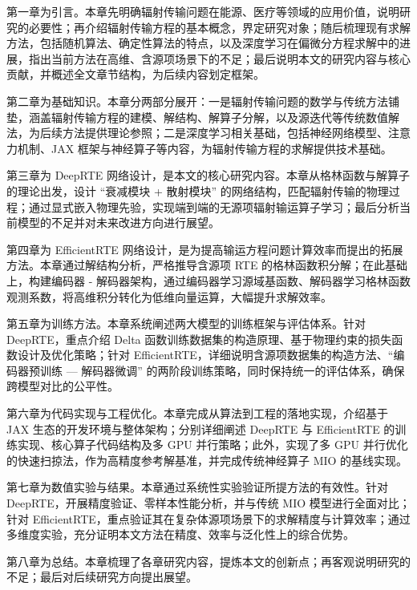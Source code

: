 第一章为引言。本章先明确辐射传输问题在能源、医疗等领域的应用价值，说明研究的必要性；再介绍辐射传输方程的基本概念，界定研究对象；随后梳理现有求解方法，包括随机算法、确定性算法的特点，以及深度学习在偏微分方程求解中的进展，指出当前方法在高维、含源项场景下的不足；最后说明本文的研究内容与核心贡献，并概述全文章节结构，为后续内容划定框架。

第二章为基础知识。本章分两部分展开：一是辐射传输问题的数学与传统方法铺垫，涵盖辐射传输方程的建模、解结构、解算子分解，以及源迭代等传统数值解法，为后续方法提供理论参照；二是深度学习相关基础，包括神经网络模型、注意力机制、JAX 框架与神经算子等内容，为辐射传输方程的求解提供技术基础。

第三章为 DeepRTE 网络设计，是本文的核心研究内容。本章从格林函数与解算子的理论出发，设计 “衰减模块 + 散射模块” 的网络结构，匹配辐射传输的物理过程；通过显式嵌入物理先验，实现端到端的无源项辐射输运算子学习；最后分析当前模型的不足并对未来改进方向进行展望。

第四章为 EfficientRTE 网络设计，是为提高输运方程问题计算效率而提出的拓展方法。本章通过解结构分析，严格推导含源项 RTE 的格林函数积分解；在此基础上，构建编码器 - 解码器架构，通过编码器学习源域基函数、解码器学习格林函数观测系数，将高维积分转化为低维向量运算，大幅提升求解效率。

第五章为训练方法。本章系统阐述两大模型的训练框架与评估体系。针对 DeepRTE，重点介绍 Delta 函数训练数据集的构造原理、基于物理约束的损失函数设计及优化策略；针对 EfficientRTE，详细说明含源项数据集的构造方法、“编码器预训练 — 解码器微调” 的两阶段训练策略，同时保持统一的评估体系，确保跨模型对比的公平性。

第六章为代码实现与工程优化。本章完成从算法到工程的落地实现，介绍基于 JAX 生态的开发环境与整体架构；分别详细阐述 DeepRTE 与 EfficientRTE 的训练实现、核心算子代码结构及多 GPU 并行策略；此外，实现了多 GPU 并行优化的快速扫掠法，作为高精度参考解基准，并完成传统神经算子 MIO 的基线实现。

第七章为数值实验与结果。本章通过系统性实验验证所提方法的有效性。针对 DeepRTE，开展精度验证、零样本性能分析，并与传统 MIO 模型进行全面对比；针对 EfficientRTE，重点验证其在复杂体源项场景下的求解精度与计算效率；通过多维度实验，充分证明本文方法在精度、效率与泛化性上的综合优势。

第八章为总结。本章梳理了各章研究内容，提炼本文的创新点；再客观说明研究的不足；最后对后续研究方向提出展望。